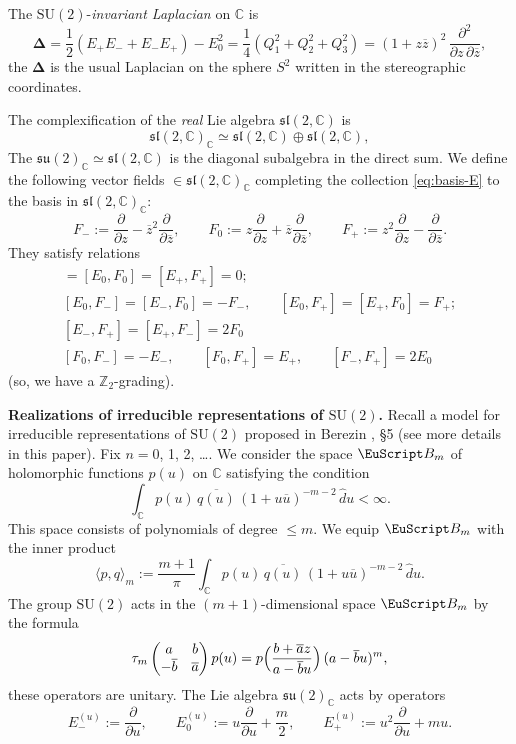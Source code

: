 \documentclass[]{amsart}
\newcounter{sec}
\newcounter{punct}[sec]
\def\punct{\refstepcounter{punct}{\arabic{sec}.\arabic{punct}.  }}
\def\SU{\mathrm {SU}}
\def\le{\leqslant}
\def\la{\langle}
\def\ra{\rangle}
\def\cB{\EuScript B}
\def\C {{\mathbb C }}
\def\Z{{\mathbb Z}}
\def\ov{\overline}
\def\wh{\widehat}
\def\sm{\smallskip}
\def\DeltA{\boldsymbol{\Delta}}
\begin{document}
The $\SU(2)$-{\it invariant Laplacian} on $\C$ 
is
\begin{equation}
\DeltA=
\frac12 (E_+E_-+E_-E_+)- E_0^2=
\frac14(Q_1^2+Q_2^2+Q_3^2)=
(1+z\ov z)^2 \,\frac{\partial^2}{\partial z\, \partial \ov z},
\end{equation}
the $\DeltA$ is the usual Laplacian on the sphere $S^2$ written
in the stereographic coordinates.

The complexification of the {\it real} Lie algebra $\mathfrak{sl}(2,\C)$
is
$$
\mathfrak{sl}(2,\C)_\C\simeq \mathfrak{sl}(2,\C)\oplus \mathfrak{sl}(2,\C),
$$
The $\mathfrak{su}(2)_\C\simeq \mathfrak{sl}(2,\C)$ is
the diagonal subalgebra in the direct sum.
We define the following vector fields $\in \mathfrak{sl}(2,\C)_\C$
completing the collection \eqref{eq:basis-E} to the basis
in $\mathfrak{sl}(2,\C)_\C$:
\begin{equation}
F_-:=\frac{\partial}{\partial z}-\ov z^2 \frac{\partial}{\partial \ov z},
\qquad 
F_0:=z\frac{\partial}{\partial z}+\ov z\frac{\partial}{\partial \ov z},\qquad
F_+:=z^2\frac{\partial}{\partial z}-\frac{\partial}{\partial \ov z}.
\label{eq:basis-F}
\end{equation}
They satisfy relations
\begin{gather}
[E_-,F_-]= [E_0,F_0]=[E_+,F_+]=0;
\\
[E_0, F_-]=[E_-,F_0]=-F_-,\qquad [E_0, F_+]=[E_+,F_0]=F_+;
\\
 [E_-,F_+]=[E_+,F_-]=2 F_0
 \\
 [F_0,F_-]=-E_-,\qquad [F_0,F_+]=E_+,\qquad [F_-,F_+]=2E_0
\end{gather}
(so, we have a $\Z_2$-grading).

\sm

{\bf \punct Realizations of irreducible representations of $\SU(2)$.}
Recall a model for irreducible representations of $\SU(2)$
proposed in Berezin \cite{Ber}, \S 5 (see more details in this paper).
Fix $n=0$, 1, 2, \dots. We consider the space $\cB_m$ of
holomorphic functions $p(u)$ on $\C$
satisfying the condition
$$
\int_\C p(u)\,\ov{q(u)}\,(1+u\ov u)^{-m-2}\,\wh d u<\infty
.$$
This  space consists of
  polynomials of degree $\le m$.
We equip $\cB_m$  with the inner product
$$
\bigl\la p,q \bigr\ra_m:=
\frac {m+1}\pi\int_\C p(u)\,\ov{q(u)}\,(1+u\ov u)^{-m-2}\,\wh d u.
$$ 
The group $\SU(2)$ acts in the $(m+1)$-dimensional
 space $\cB_m$ by the formula
$$
\tau_m\begin{pmatrix}
a&b\\-\ov b&\ov a
\end{pmatrix} p(u)=
p\Bigl(\frac{b+\ov a z}{a-\ov b u}\Bigr)\,(a-\ov b u)^m,
$$
these operators are unitary. The Lie algebra
$\mathfrak{su}(2)_\C$
acts by operators
\begin{equation}
E^{(u)}_-:=\frac{\partial}{\partial u},\qquad
E^{(u)}_0:=u \frac{\partial}{\partial u}+\frac{m}{2},
\qquad E^{(u)}_+:=u^2\frac{\partial}{\partial u}+m u.
\end{equation}
\end{document}
